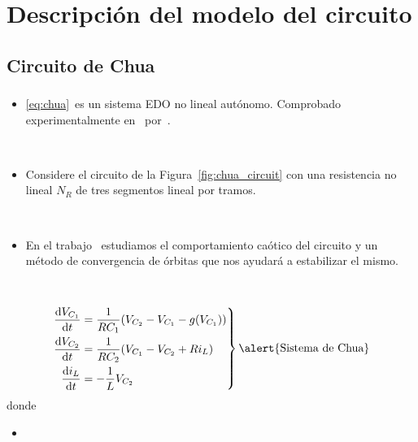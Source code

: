 \section{Descripción del modelo del circuito}

\subsection{Circuito de Chua}

\begin{frame}
	\frametitle{\subsecname}

	\begin{itemize}
		\item

		      \eqref{eq:chua}~es un sistema EDO no lineal autónomo.
		      Comprobado experimentalmente en~\citeyear{Zhong:M84/56}
		      por~.

		      \


		\item

		      Considere el circuito de la Figura~\ref{fig:chua_circuit}
		      con una \alert{resistencia no lineal $N_{R}$} de tres
		      segmentos lineal por tramos.

		      \

		\item

		      En el trabajo~ estudiamos el
		      comportamiento caótico del circuito y un
		      \alert{método de convergencia de órbitas} que nos ayudará
		      a estabilizar el mismo.
	\end{itemize}

	\

	\begin{minipage}{0.55\textwidth}
		\begin{equation}\label{eq:chua}
			\left.
			\begin{aligned}
				\diff{V_{C_{1}}}{t} & =\frac{1}{RC_{1}}(V_{C_{2}} - V_{C_{1}} - g(V_{C_{1}})) \\
				\diff{V_{C_{2}}}{t} & =\frac{1}{RC_{2}}(V_{C_{1}} - V_{C_{2}} + Ri_{L})       \\
				\diff{i_{L}}{t}     & =-\frac{1}{L}V_{C_{2}}
			\end{aligned}
			\right\}
			\text{\alert{Sistema de Chua}}
		\end{equation}
		donde
		\begin{itemize}
			\item


\end{itemize}
\end{minipage}
\end{frame}
